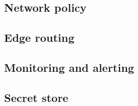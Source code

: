 \subsection{Network policy}



\subsection{Edge routing}



\subsection{Monitoring and alerting}




\subsection{Secret store}



